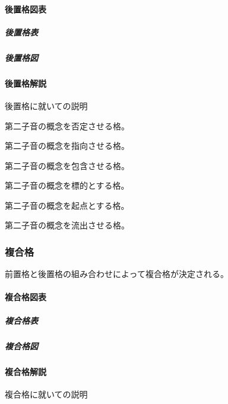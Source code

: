 \documentclass[
  japanese,
]{article}
\providecommand{\tightlist}{%
  \setlength{\itemsep}{0pt}\setlength{\parskip}{0pt}}
\begin{document}
\paragraph{後置格図表}\label{subsection5.2.1}

\subparagraph{後置格表}\label{subsubsection5.2.1.1}

\subparagraph{後置格図}\label{subsubsection5.2.1.2}

\paragraph{後置格解説}\label{subsection5.2.2}

後置格に就いての説明

\begin{description}
\tightlist
\item[否格]
第二子音の概念を否定させる格。
\item[与格]
第二子音の概念を指向させる格。
\item[属格]
第二子音の概念を包含させる格。
\item[対格]
第二子音の概念を標的とする格。
\item[主格]
第二子音の概念を起点とする格。
\item[流格]
第二子音の概念を流出させる格。
\end{description}

\subsubsection{複合格}\label{section5.3}

前置格と後置格の組み合わせによって複合格が決定される。

\paragraph{複合格図表}\label{subsection5.3.1}

\subparagraph{複合格表}\label{subsubsection5.3.1.1}

\subparagraph{複合格図}\label{subsubsection5.3.1.2}

\paragraph{複合格解説}\label{subsection5.3.2}

複合格に就いての説明
\end{document}
